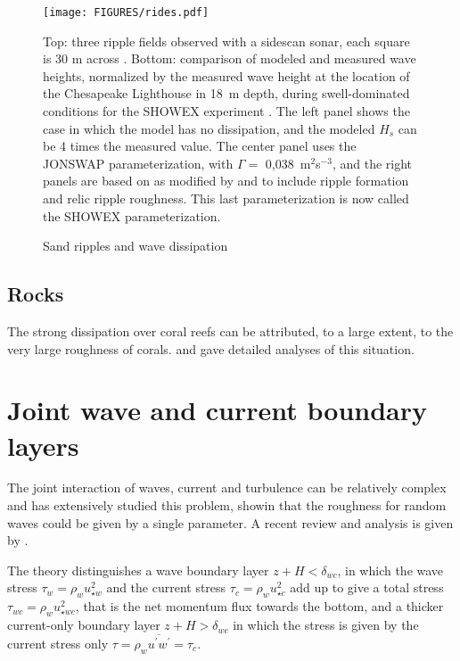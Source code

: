 \begin{figure}[htb]
\centerline{\texttt{[image: FIGURES/rides.pdf]}}
  \caption{Sand ripples and wave dissipation}
  {Top: three ripple fields observed with a sidescan sonar, each square is 30 m across \citep{Ardhuin&al.2002}. Bottom: 
  comparison of modeled and measured wave heights, normalized by the measured wave height at the location of the Chesapeake Lighthouse in 18~m depth, during swell-dominated conditions for the SHOWEX experiment \citep{Ardhuin&al.2003b}. The left panel shows the case in which the model has no dissipation, and the modeled $H_s$ can be 4 times the measured value. The center panel uses the JONSWAP parameterization, with $\Gamma =$ 0,038~m$^{2}$s$^{-3}$, and the right panels are based on \cite{Grant&Madsen1979} as modified by 
  \cite{Tolman1994} and \cite{Ardhuin&al.2003a} to include ripple formation and relic ripple roughness. This last parameterization is now called the SHOWEX parameterization.}
  \label{rides}
\end{figure}

\subsection{Rocks}
The strong dissipation over coral reefs can be attributed, to a large extent, to the very large roughness of corals. \cite{Lowe&al.2007} 
and \cite{Monismith&al.2015} gave detailed analyses of this situation. 


\section{Joint wave and current boundary layers}
The joint interaction of waves, current and turbulence can be relatively complex and \cite{Madsen1994} has extensively studied this problem, showin that the roughness for random waves could be given by a single parameter. A recent review and analysis is given by \cite{Zou2004}.

The theory distinguishes a wave boundary layer $z+H <
\delta_{wc}$, in which the wave stress  $\tau_{w}=\rho_w  u_{\star w}^2$ and the current stress 
$\tau_{c}=\rho_w u_{\star c}^2$  add up to give a total stress $\tau_{wc}=\rho_w
u_{\star wc}^2$, that is the net momentum flux towards the bottom, and a thicker current-only boundary layer  $z+H > \delta_{wc}$ in which the stress is given by the current stress only  $\tau=\rho_w
\overline{u^\prime w^\prime}=\tau_{c}$.

